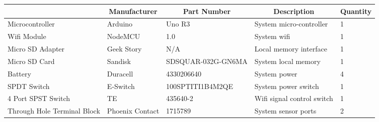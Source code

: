 \documentclass[12pt, titlepage]{article}
\begin{document}
\begin{table}[H]
  \centering
  \begin{tabular}{|p{3cm}|p{2cm}|p{4cm}|p{4cm}|p{2cm}|}
  \hline
  \rowcolor[gray]{0.9}
  \multicolumn{1}{|c|}{\textbf{Component}} & \multicolumn{1}{c|}{\textbf{Manufacturer}} & \multicolumn{1}{c|}{\textbf{Part Number}} & \multicolumn{1}{c|}{\textbf{Description}} & \multicolumn{1}{|c|}{\textbf{Quantity}}
  \\ \hline
  Microcontroller
  & Arduino
  & Uno R3
  & System micro-controller
  & 1
  \newline                                
  \\ \hline

  Wifi Module                              
  & NodeMCU
  & 1.0
  & System wifi 
  & 1
  \newline                                
  \\ \hline

  Micro SD Adapter                          
  & Geek Story
  & N/A
  & Local memory interface
  & 1
  \newline                                
  \\ \hline

  Micro SD Card                                
  & Sandisk
  & SDSQUAR-032G-GN6MA
  & System local memory
  & 1
  \newline                            
  \\ \hline

  Battery                                
  & Duracell
  & 4330206640
  & System power
  & 4
  \newline                            
  \\ \hline

  SPDT Switch                                
  & E-Switch
  & 100SPTITI1B4M2QE
  & System power switch
  & 1
  \newline                            
  \\ \hline

  4 Port SPST Switch                                
  & TE
  & 435640-2
  & Wifi signal control switch
  & 1
  \newline                            
  \\ \hline

  Through Hole Terminal Block                                
  & Phoenix Contact
  & 1715789
  & System sensor ports
  & 2
  \newline                            
  \\ \hline


\end{tabular}
\end{table}
\end{document}
